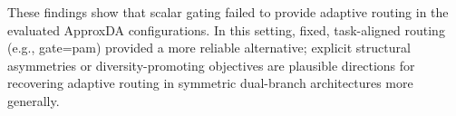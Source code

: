 These findings show that scalar gating failed to provide adaptive routing in the evaluated ApproxDA configurations. In this setting, fixed, task-aligned routing (e.g., gate=pam) provided a more reliable alternative; explicit structural asymmetries or diversity-promoting objectives are plausible directions for recovering adaptive routing in symmetric dual-branch architectures more generally.
